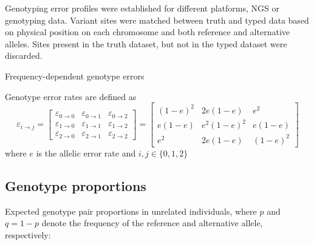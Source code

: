 Genotyping error profiles were established for different platforms, NGS or genotyping data.
Variant sites were matched between truth and typed data based on
physical position on each chromosome and both reference and alternative alleles.
Sites present in the truth dataset, but not in the typed dataset were discarded.

Frequency-dependent genotype errors


Genotype error rates are defined as
\[
\varepsilon_{i \rightarrow j} =
\begin{bmatrix}
	\varepsilon_{0 \rightarrow 0} & \varepsilon_{0 \rightarrow 1} & \varepsilon_{0 \rightarrow 2} \\
	\varepsilon_{1 \rightarrow 0} & \varepsilon_{1 \rightarrow 1} & \varepsilon_{1 \rightarrow 2} \\
	\varepsilon_{2 \rightarrow 0} & \varepsilon_{2 \rightarrow 1} & \varepsilon_{2 \rightarrow 2}
\end{bmatrix}
=
\begin{bmatrix}
	(1 - e)^2  &  2e(1 - e)      &  e^2       \\
	e(1 - e)   &  e^2 (1 - e)^2  &  e(1 - e)  \\
	e^2 &  2e(1 - e)      &  (1 - e)^2
\end{bmatrix}
\]
where $e$ is the allelic error rate and $i, j \in \lbrace 0, 1, 2 \rbrace$





\subsection{Genotype proportions}


Expected genotype pair proportions in unrelated individuals, where $p$ and $q = 1 - p$ denote the frequency of the reference and alternative allele, respectively:

